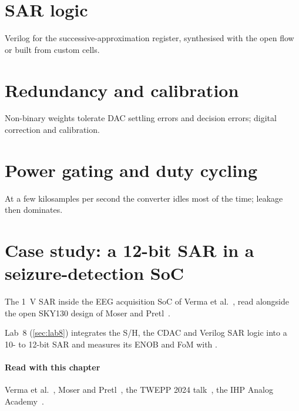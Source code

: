 \section{SAR logic}\label{sec:ch18-3}
Verilog for the successive-approximation register, synthesised with the open flow or built from custom cells.

\section{Redundancy and calibration}\label{sec:ch18-4}
Non-binary weights tolerate DAC settling errors and decision errors; digital correction and calibration.

\section{Power gating and duty cycling}\label{sec:ch18-5}
At a few kilosamples per second the converter idles most of the time; leakage then dominates.

\section{Case study: a 12-bit SAR in a seizure-detection SoC}\label{sec:ch18-6}
The \qty{1}{\volt} SAR inside the EEG acquisition SoC of Verma et al.~\cite{verma2010}, read alongside the open SKY130 design of Moser and Pretl~\cite{jkusar}.

\begin{tryit}
Lab~8 (\cref{sec:lab8}) integrates the S/H, the CDAC and Verilog SAR logic into a 10- to 12-bit SAR and measures its ENOB and FoM with .
\end{tryit}

\paragraph{Read with this chapter} Verma et al.~\cite{verma2010}, Moser and Pretl~\cite{jkusar}, the TWEPP 2024 talk~\cite{twepp2024sar}, the IHP Analog Academy~\cite{ihpacademy}.

